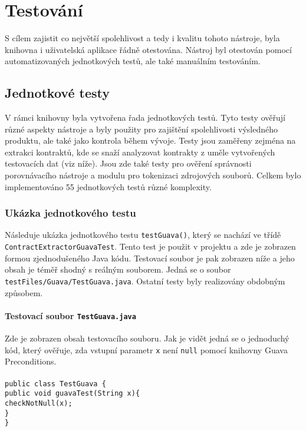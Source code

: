 \chapter{Testování}
	S cílem zajistit co největší spolehlivost a tedy i kvalitu tohoto nástroje, byla knihovna i uživatelská aplikace řádně otestována. Nástroj byl otestován pomocí automatizovaných jednotkových testů, ale také manuálním testováním.
	
	\section{Jednotkové testy}
		V rámci knihovny byla vytvořena řada jednotkových testů. Tyto testy ověřují různé aspekty nástroje a byly použity pro zajištění spolehlivosti výsledného produktu, ale také jako kontrola během vývoje. Testy jsou zaměřeny zejména na extrakci kontraktů, kde se snaží analyzovat kontrakty z uměle vytvořených testovacích dat (viz níže). Jsou zde také testy pro ověření správnosti porovnávacího nástroje a modulu pro tokenizaci zdrojových souborů. Celkem bylo implementováno 55 jednotkových testů různé komplexity.
		
		\subsection{Ukázka jednotkového testu}
			Následuje ukázka jednotkového testu \texttt{testGuava()}, který se nachází ve třídě \texttt{ContractExtractorGuavaTest}. Tento test je použit v projektu a zde je zobrazen formou zjednodušeného Java kódu. Testovací soubor je pak zobrazen níže a jeho obsah je téměř shodný s reálným souborem. Jedná se o soubor \texttt{testFiles/Guava/TestGuava.java}. Ostatní testy byly realizovány obdobným způsobem.
			
			\subsubsection{Testovací soubor \texttt{TestGuava.java}}
				Zde je zobrazen obsah testovacího souboru. Jak je vidět jedná se o jednoduchý kód, který ověřuje, zda vstupní parametr \texttt{x} není \texttt{null} pomocí knihovny Guava Preconditions.\\\\	
				\- \- \- \- \- \- \texttt{public class TestGuava \{}\\
				\- \- \- \- \- \- \- \- \- \texttt{public void guavaTest(String x)\{}\\
    			\- \- \- \- \- \- \- \- \- \- \- \- \texttt{checkNotNull(x);}\\
				\- \- \- \- \- \- \- \- \- \texttt{\}}\\
				\- \- \- \- \- \- \texttt{\}}        	
			
